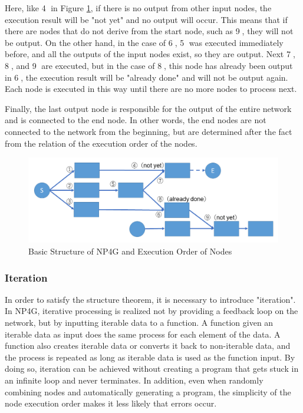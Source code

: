 \documentclass{article}
\begin{document}
Here, like \textcircled{\scriptsize 4} in Figure \ref{fig:sequence}, if there is no output from other input nodes, the execution result will be "not yet" and no output will occur.
This means that if there are nodes that do not derive from the start node, such as \textcircled{\scriptsize 9}, they will not be output.
On the other hand, in the case of \textcircled{\scriptsize 6}, \textcircled{\scriptsize 5} was executed immediately before, and all the outputs of the input nodes exist, so they are output.
Next \textcircled{\scriptsize 7}, \textcircled{\scriptsize 8}, and  \textcircled{\scriptsize 9} are executed, but in the case of \textcircled{\scriptsize 8}, this node has already been 
 output in \textcircled{\scriptsize 6}, the execution result will be "already done" and will not be output again.
Each node is executed in this way until there are no more nodes to process next.

Finally, the last output node is responsible for the output of the entire network and is connected to the end node.
In other words, the end nodes are not connected to the network from the beginning, but are determined after the fact from the relation of the execution order of the nodes.

\begin{figure}[t]
\begin{center}
\includegraphics[width=130mm]{sequence.png}
\end{center}
\caption{Basic Structure of NP4G and Execution Order of Nodes}
\label{fig:sequence}
\end{figure}

\subsubsection {Iteration}
In order to satisfy the structure theorem, it is necessary to introduce "iteration".
In NP4G, iterative processing is realized not by providing a feedback loop on the network, but by inputting iterable data to a function.
A function given an iterable data as input does the same process for each element of the data.
A function also creates iterable data or converts it back to non-iterable data, and the process is repeated as long as iterable data is used as the function input.
By doing so, iteration can be achieved without creating a program that gets stuck in an infinite loop and never terminates.
In addition, even when randomly combining nodes and automatically generating a program, the simplicity of the node execution order makes it less likely that errors occur.
\end{document}
